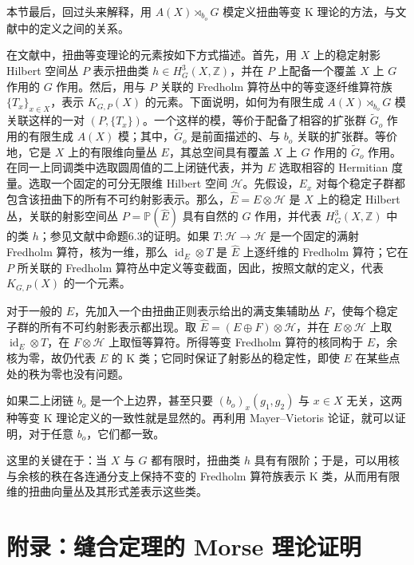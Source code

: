 本节最后，回过头来解释，用 $A(X)\rtimes_{b_o}G$ 模定义扭曲等变 K 理论的方法，与文献中的定义之间的关系。

在文献中，扭曲等变理论的元素按如下方式描述。首先，用 $X$ 上的稳定射影 Hilbert 空间丛 $P$ 表示扭曲类 $h\in H_G^3(X,\mathbb{Z})$，并在 $P$ 上配备一个覆盖 $X$ 上 $G$ 作用的 $G$ 作用。然后，用与 $P$ 关联的 Fredholm 算符丛中的等变逐纤维算符族 $\{T_x\}_{x\in X}$，表示 $K_{G,P}(X)$ 的元素。下面说明，如何为有限生成 $A(X)\rtimes_{b_o}G$ 模关联这样的一对 $(P,\{T_x\})$。一个这样的模，等价于配备了相容的扩张群 $\widetilde{G}_o$ 作用的有限生成 $A(X)$ 模；其中，$\widetilde{G}_o$ 是前面描述的、与 $b_o$ 关联的扩张群。等价地，它是 $X$ 上的有限维向量丛 $E$，其总空间具有覆盖 $X$ 上 $G$ 作用的 $\widetilde{G}_o$ 作用。在同一上同调类中选取圆周值的二上闭链代表，并为 $E$ 选取相容的 Hermitian 度量。选取一个固定的可分无限维 Hilbert 空间 $\mathcal{H}$。先假设，$E_x$ 对每个稳定子群都包含该扭曲下的所有不可约射影表示。那么，$\widehat{E}=E\otimes\mathcal{H}$ 是 $X$ 上的稳定 Hilbert 丛，关联的射影空间丛 $P=\mathbb{P}(\widehat{E})$ 具有自然的 $G$ 作用，并代表 $H_G^3(X,\mathbb{Z})$ 中的类 $h$；参见文献中命题6.3的证明。如果 $T\colon\mathcal{H}\to\mathcal{H}$ 是一个固定的满射 Fredholm 算符，核为一维，那么 $\operatorname{id}_E\otimes T$ 是 $\widehat{E}$ 上逐纤维的 Fredholm 算符；它在 $P$ 所关联的 Fredholm 算符丛中定义等变截面，因此，按照文献的定义，代表 $K_{G,P}(X)$ 的一个元素。

对于一般的 $E$，先加入一个由扭曲正则表示给出的满支集辅助丛 $F$，使每个稳定子群的所有不可约射影表示都出现。取 $\widehat{E}=(E\oplus F)\otimes\mathcal{H}$，并在 $E\otimes\mathcal{H}$ 上取 $\operatorname{id}_E\otimes T$，在 $F\otimes\mathcal{H}$ 上取恒等算符。所得等变 Fredholm 算符的核同构于 $E$，余核为零，故仍代表 $E$ 的 K 类；它同时保证了射影丛的稳定性，即使 $E$ 在某些点处的秩为零也没有问题。

如果二上闭链 $b_o$ 是一个上边界，甚至只要 $(b_o)_x(g_1,g_2)$ 与 $x\in X$ 无关，这两种等变 K 理论定义的一致性就是显然的。再利用 Mayer--Vietoris 论证，就可以证明，对于任意 $b_o$，它们都一致。

这里的关键在于：当 $X$ 与 $G$ 都有限时，扭曲类 $h$ 具有有限阶；于是，可以用核与余核的秩在各连通分支上保持不变的 Fredholm 算符族表示 K 类，从而用有限维的扭曲向量丛及其形式差表示这些类。

\section{附录：缝合定理的 Morse 理论证明}\label{sec:2.7}

